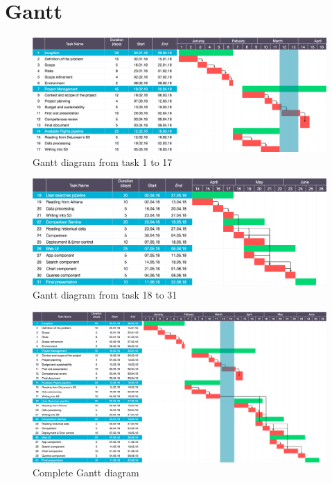 
\section{Gantt}

\begin{figure}[H]
\includegraphics[scale=0.14]{diagrams/gantt01-17.png}
\caption{Gantt diagram from task 1 to 17}
\end{figure}

\begin{figure}[H]
\includegraphics[scale=0.14]{diagrams/gantt18-31.png}
\caption{Gantt diagram from task 18 to 31}
\end{figure}

\begin{figure}[H]
\centering
\includegraphics[scale=0.15, angle=270]{diagrams/gantt.png}
\caption{Complete Gantt diagram}
\end{figure}



